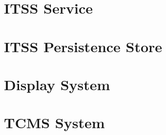 


\section{ITSS Service}


\section{ITSS Persistence Store}

\section{Display System}

\section{TCMS System}

